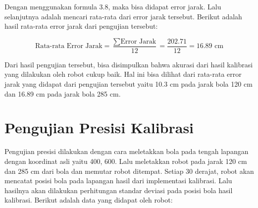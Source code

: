 Dengan menggunakan formula 3.8, maka bisa didapat error jarak. Lalu selanjutnya adalah mencari rata-rata dari error jarak tersebut. Berikut adalah hasil rata-rata error jarak dari pengujian tersebut: 

\begin{equation}
  \text{Rata-rata Error Jarak} = \frac{\sum \text{Error Jarak}}{12} = \frac{202.71}{12} = 16.89 \text{ cm}
\end{equation}

Dari hasil pengujian tersebut, bisa disimpulkan bahwa akurasi dari hasil kalibrasi yang dilakukan oleh robot cukup baik. Hal ini bisa dilihat dari rata-rata error jarak yang didapat dari pengujian tersebut yaitu 10.3 cm pada jarak bola 120 cm dan 16.89 cm pada jarak bola 285 cm. 

\section{Pengujian Presisi Kalibrasi}
\label{sec:pengujianpresisikalibrasi} 

Pengujian presisi dilakukan dengan cara meletakkan bola pada tengah lapangan dengan koordinat asli yaitu {400, 600}. Lalu meletakkan robot pada jarak 120 cm dan 285 cm dari bola dan memutar robot ditempat. Setiap 30 derajat, robot akan mencatat posisi bola pada lapangan hasil dari implementasi kalibrasi. Lalu hasilnya akan dilakukan perhitungan standar deviasi pada posisi bola hasil kalibrasi. Berikut adalah data yang didapat oleh robot: 


